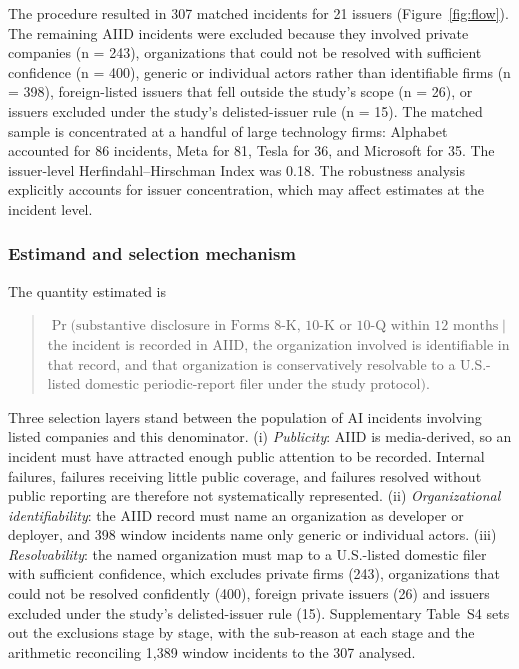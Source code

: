 \documentclass[utf8]{FrontiersinHarvard}
\begin{document}
The procedure resulted in 307 matched incidents for 21 issuers (Figure~\ref{fig:flow}). The remaining AIID incidents were excluded because they involved private companies (n = 243), organizations that could not be resolved with sufficient confidence (n = 400), generic or individual actors rather than identifiable firms (n = 398), foreign-listed issuers that fell outside the study's scope (n = 26), or issuers excluded under the study's delisted-issuer rule (n = 15). The matched sample is concentrated at a handful of large technology firms: Alphabet accounted for 86 incidents, Meta for 81, Tesla for 36, and Microsoft for 35. The issuer-level Herfindahl--Hirschman Index was 0.18. The robustness analysis explicitly accounts for issuer concentration, which may affect estimates at the incident level.

\subsubsection{Estimand and selection mechanism}\label{sec:estimand}
The quantity estimated is
\begin{quote}
$\Pr(\text{substantive disclosure in Forms 8-K, 10-K or 10-Q within 12 months} \mid$ the incident is recorded in AIID, the organization involved is identifiable in that record, and that organization is conservatively resolvable to a U.S.-listed domestic periodic-report filer under the study protocol$)$.
\end{quote}
Three selection layers stand between the population of AI incidents involving listed companies and this denominator. (i) \emph{Publicity}: AIID is media-derived, so an incident must have attracted enough public attention to be recorded. Internal failures, failures receiving little public coverage, and failures resolved without public reporting are therefore not systematically represented. (ii) \emph{Organizational identifiability}: the AIID record must name an organization as developer or deployer, and 398 window incidents name only generic or individual actors. (iii) \emph{Resolvability}: the named organization must map to a U.S.-listed domestic filer with sufficient confidence, which excludes private firms (243), organizations that could not be resolved confidently (400), foreign private issuers (26) and issuers excluded under the study's delisted-issuer rule (15). Supplementary Table~S4 sets out the exclusions stage by stage, with the sub-reason at each stage and the arithmetic reconciling 1{,}389 window incidents to the 307 analysed.
\end{document}

